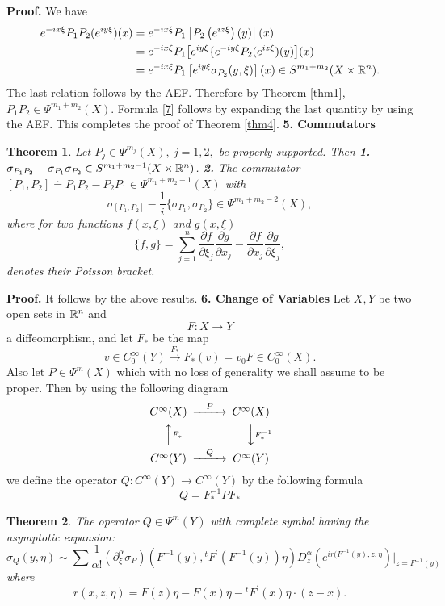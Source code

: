 \documentclass[12pt,reqno]{amsart}
\theoremstyle{plain}  %
\newtheorem{theorem}{Theorem}
\theoremstyle{definition}
\newcommand{\nin}{\noindent}
\begin{document}
\nin
{\bf Proof.}  We have
\begin{equation*}
	\begin{split}
e^{-ix \xi} P_1 P_2 (e^{iy \xi})(x) &= e^{-ix \xi}  P_1 \left [ P_2 \left
(e^{iz \xi} \right )(y) \right ](x)\\
&= e^{-ix \xi} P_1 \big  [ e^{iy \xi} \{e^{-iy \xi} 
P_2 (e^{i z \xi}) (y) \big ](x)\\ 
&= e^{-ix \xi} P_1 \left [e^{iy \xi} \sigma_{P_2} (y, \xi) \right ] (x) \in
S^{m_1 + m_2} (X \times \Bbb R^n).
\end{split}
\end{equation*}
The last relation follows by the AEF.  Therefore by Theorem \ref{thm1}, $ P_1 P_2 \in
\Psi^{m_1 + m_2}(X)$.  Formula \eqref{7} follows by expanding the last quantity by
using the AEF.  This completes the proof of Theorem \ref{thm4}.
\vskip0.1in
\noindent
{\bf 5. Commutators}
\vskip0.1in
\begin{theorem}
	\label{thm5}
	Let $ P_j \in \Psi^{m_j} (X), \ j = 1, 2,$ be
properly supported.  Then
\vskip0.1in
\noindent
{\bf 1.}  $ \sigma_{P_1 P_2} - \sigma_{P_1} \sigma_{P_2} \in S^{m_1 + m_2 -1}
(X \times \Bbb R^n) $.
\vskip0.1in
\noindent
{\bf 2.}  The commutator $ [P_1, P_2] \doteq P_1 P_2 - P_2 P_1 \in \Psi^{m_1
+ m_2 -1} (X) $ with
$$\sigma_{[P_1, P_2]} - \frac{1}{i} \{ \sigma_{P_1}, \sigma_{P_2} \} \in
\Psi^{m_1 + m_2 -2} (X), $$
where for two functions $ f(x, \xi) $ and $ g(x, \xi) $ 
$$\{f, g\} = \sum^n_{j=1} \frac{\partial f}{\partial \xi_j} \frac{\partial
g}{\partial x_j} - \frac{\partial f}{\partial x_j} \frac{\partial g}{\partial \xi_j}, $$
denotes their
Poisson  bracket.
\end{theorem}
\nin
{\bf Proof.}  It follows by the above results.
\vskip0.1in
\noindent
{\bf 6.  Change of Variables}
\vskip0.1in
\nin
Let $ X, Y $ be two open sets in $ \Bbb R^n $ and
$$F: X \longrightarrow Y $$ a diffeomorphism, and let $ F_* $ be the map $$v \in
C^\infty_0 (Y) \xrightarrow{F_*} F_* (v) = v_0 F \in C^\infty_0
(X). $$ Also let $ P \in \Psi^m(X) $ which with no loss of generality we shall
assume to be proper.  Then by using the following diagram $$\CD C^\infty(X)
@>P>> C^\infty (X)\\ @AAF_*A    @VVF^{-1}_*V\\ C^\infty (Y) @>Q>> C^\infty
(Y) \endCD$$ we define the operator $ Q : C^\infty (Y) \longrightarrow C^\infty
(Y) $ by the following formula $$Q = F^{-1}_* P F_*$$
\begin{theorem}  The operator $ Q \in \Psi^m (Y) $ with complete symbol
having the asymptotic expansion:
$$\sigma_Q(y, \eta) \sim \sum \frac{1}{\alpha !} \left ( \partial^\alpha_\xi
\sigma_P \right ) (F^{-1} (y), {}^tF^\prime (F^{-1} (y)) \eta) 
 D^\alpha_z (e^{ir(F^{-1} (y), z, \eta})
\bigg |_{z=F^{-1} (y)}$$ 
where
$$r(x, z, \eta) = F(z) \eta - F(x) \eta - {}^tF^\prime (x) \eta \cdot (z - x). $$
\end{theorem}
\end{document}
